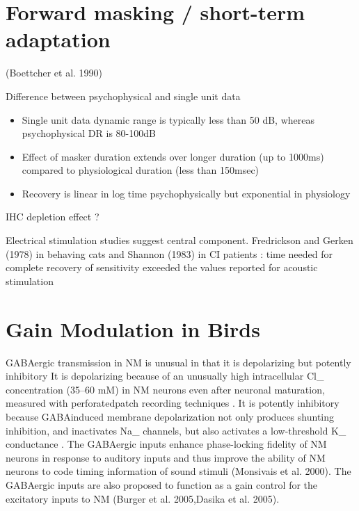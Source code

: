 \documentclass[10pt,a4paper]{article}
\begin{document}
\section{Forward masking / short-term adaptation}

(Boettcher et al. 1990)

Difference between psychophysical and single unit data


\begin{itemize}
\item Single unit data dynamic range is typically less than 50 dB, whereas
  psychophysical DR is 80-100dB
\item Effect of masker duration extends over longer duration (up to 1000ms)
  compared to physiological duration (less than 150msec)
\item Recovery is linear in log time psychophysically but exponential in
  physiology \citep{Carlyon:1988}
\end{itemize}

IHC depletion effect ?  \citep{WestermanSmith:1987}

Electrical stimulation studies suggest central component. Fredrickson and Gerken
(1978) in behaving cats and Shannon (1983) in CI patients : time needed for
complete recovery of sensitivity exceeded the values reported for acoustic
stimulation

\section{Gain Modulation in Birds}

\citep{Lu:2007}

GABAergic transmission in NM is unusual in that it is depolarizing but potently
inhibitory %
It is depolarizing because of an unusually high intracellular Cl\_ concentration
(35--60 mM) in NM neurons even after neuronal maturation, measured with
perforatedpatch recording techniques
\citep{LuTrussell:2001,MonsivaisRubel:2001}. It is potently inhibitory because
GABAinduced membrane depolarization not only produces shunting inhibition, and
inactivates Na\_ channels, but also activates a low-threshold K\_ conductance
\citep{MonsivaisRubel:2001}.  The GABAergic inputs enhance phase-locking
fidelity of NM neurons in response to auditory inputs and thus improve the
ability of NM neurons to code timing information of sound stimuli (Monsivais et
al. 2000).  The GABAergic inputs are also proposed to function as a gain control
for the excitatory inputs to NM (Burger et al. 2005,Dasika et al. 2005).


 

\end{document}
